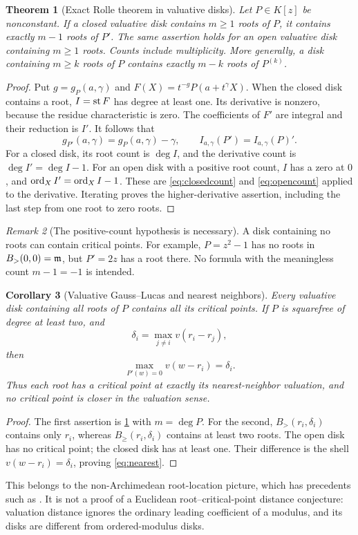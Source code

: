 \documentclass[11pt,letterpaper,oneside]{article}
\numberwithin{equation}{section}
\newtheorem{theorem}{Theorem}[section]
\newtheorem{corollary}[theorem]{Corollary}
\theoremstyle{definition}
\theoremstyle{remark}\newtheorem{remark}[theorem]{Remark}
\newcommand{\Bcl}{B_{\geq}}\newcommand{\Bop}{B_{>}}
\begin{document}
\begin{theorem}[Exact Rolle theorem in valuative disks]\label{thm:valuerolle}
Let $P\in K[z]$ be nonconstant. If a closed valuative disk contains
$m\geq1$ roots of $P$, it contains exactly $m-1$ roots of $P'$.
The same assertion holds for an open valuative disk containing $m\geq1$
roots. Counts include multiplicity. More generally, a disk containing
$m\geq k$ roots of $P$ contains exactly $m-k$ roots of $P^{(k)}$.
\end{theorem}
\begin{proof}
Put $g=g_P(a,\gamma)$ and $F(X)=t^{-g}P(a+t^\gamma X)$.
When the closed disk contains a root, $I=\operatorname{st} F$ has degree at least one.
Its derivative is nonzero, because the residue characteristic is zero.
The coefficients of $F'$ are integral and their reduction is $I'$.
It follows that
\begin{equation}\label{eq:initialderivative}
 g_{P'}(a,\gamma)=g_P(a,\gamma)-\gamma,
 \qquad I_{a,\gamma}(P')=I_{a,\gamma}(P)'.
\end{equation}
For a closed disk, its root count is $\deg I$, and the derivative count
is $\deg I'=\deg I-1$. For an open disk with a positive root count,
$I$ has a zero at $0$, and $\operatorname{ord}_X I'=\operatorname{ord}_X I-1$.
These are \eqref{eq:closedcount} and \eqref{eq:opencount} applied to the
derivative. Iterating proves the higher-derivative assertion, including
the last step from one root to zero roots.
\end{proof}

\begin{remark}[The positive-count hypothesis is necessary]
A disk containing no roots can contain critical points. For example,
$P=z^2-1$ has no roots in $\Bop(0,0)=\mm$, but $P'=2z$ has a root
there. No formula with the meaningless count $m-1=-1$ is intended.
\end{remark}

\begin{corollary}[Valuative Gauss--Lucas and nearest neighbors]\label{cor:nearest}
Every valuative disk containing all roots of $P$ contains all its critical
points. If $P$ is squarefree of degree at least two, and
\[
 \delta_i=\max_{j\ne i}v(r_i-r_j),
\]
then
\begin{equation}\label{eq:nearest}
 \max_{P'(w)=0}v(w-r_i)=\delta_i.
\end{equation}
Thus each root has a critical point at exactly its nearest-neighbor
valuation, and no critical point is closer in the valuation sense.
\end{corollary}
\begin{proof}
The first assertion is \cref{thm:valuerolle} with $m=\deg P$.
For the second, $\Bop(r_i,\delta_i)$ contains only $r_i$, whereas
$\Bcl(r_i,\delta_i)$ contains at least two roots. The open disk has no
critical point; the closed disk has at least one. Their difference is the
shell $v(w-r_i)=\delta_i$, proving \eqref{eq:nearest}.
\end{proof}
This belongs to the non-Archimedean root-location picture, which has
precedents such as \cite{ChoiLee}. It is not a proof of a Euclidean
root--critical-point distance conjecture: valuation distance ignores the
ordinary leading coefficient of a modulus, and its disks are different
from ordered-modulus disks.
\end{document}
